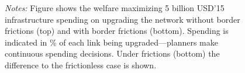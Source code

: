 \documentclass[a4paper]{article}
\begin{document}
\begin{figure}[h!]
\scriptsize 
\emph{Notes:} Figure shows the welfare maximizing 5 billion USD'15 infrastructure spending on upgrading the network without border frictions (top) and with border frictions (bottom). Spending is indicated in \% of each link being upgraded---planners make continuous spending decisions. Under frictions (bottom) the difference to the frictionless case is shown.   
\end{figure}
\end{document}
